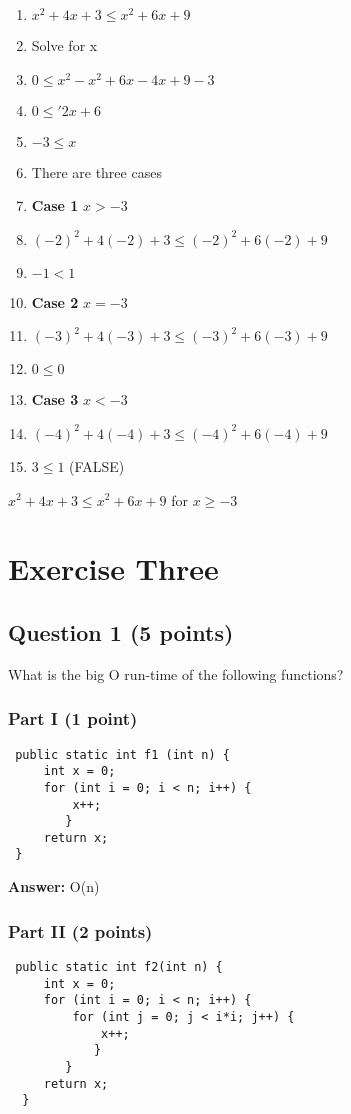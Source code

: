 \documentclass[12pt]{extarticle}
\begin{document}
\begin{enumerate}
    \item $x^2 + 4x + 3 \leq x^2 + 6x + 9$
    \item Solve for x
    \item $0 \leq x^2 - x^2 + 6x - 4x + 9 - 3$
    \item $0 \leq'2x+6$
    \item $-3 \leq x$
    \item There are three cases
    \item {\bf Case 1}  $x > -3$ 
    \item $(-2)^2 + 4(-2) + 3 \leq (-2)^2 + 6(-2) + 9$
    \item $-1 < 1$
    \item {\bf Case 2} $x = -3$
    \item $(-3)^2 + 4(-3) + 3 \leq (-3)^2 + 6(-3) + 9$
    \item $0 \leq 0$
    \item {\bf Case 3} $x < -3$
    \item  $(-4)^2 + 4(-4) + 3 \leq (-4)^2 + 6(-4) + 9$
    \item $3 \leq 1$ (FALSE)
\end{enumerate}
    $x^2 + 4x + 3 \leq x^2 + 6x + 9$ for $x \geq -3$


\section{ Exercise Three}
\subsection{Question 1 (5 points)}
What is the big O run-time of the following functions? 

\subsubsection{Part I (1 point)}
\begin{lstlisting}
 public static int f1 (int n) {
     int x = 0;
     for (int i = 0; i < n; i++) {
         x++;
        }
     return x;
 }
\end{lstlisting}

{\bf Answer:} 
O(n)

\vspace{10mm}
\subsubsection{Part II (2 points)}
\begin{lstlisting}
 public static int f2(int n) {
     int x = 0;
     for (int i = 0; i < n; i++) {
         for (int j = 0; j < i*i; j++) {
             x++;
            }
        }
     return x;
  }
\end{lstlisting}
\end{document}
